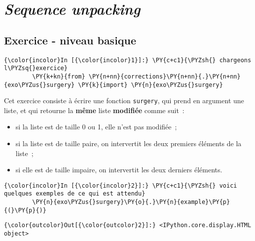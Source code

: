     
    
    
    

    

    \hypertarget{sequence-unpacking}{%
\section{\texorpdfstring{\emph{Sequence
unpacking}}{Sequence unpacking}}\label{sequence-unpacking}}

    \hypertarget{exercice---niveau-basique}{%
\subsection{Exercice - niveau basique}\label{exercice---niveau-basique}}

    \begin{Verbatim}[commandchars=\\\{\},frame=single,framerule=0.3mm,rulecolor=\color{cellframecolor}]
{\color{incolor}In [{\color{incolor}1}]:} \PY{c+c1}{\PYZsh{} chargeons l\PYZsq{}exercice}
        \PY{k+kn}{from} \PY{n+nn}{corrections}\PY{n+nn}{.}\PY{n+nn}{exo\PYZus{}surgery} \PY{k}{import} \PY{n}{exo\PYZus{}surgery}
\end{Verbatim}


    Cet exercice consiste à écrire une fonction \texttt{surgery}, qui prend
en argument une liste, et qui retourne la \textbf{même} liste
\textbf{modifiée} comme suit~:

\begin{itemize}
\tightlist
\item
  si la liste est de taille 0 ou 1, elle n'est pas modifiée~;
\item
  si la liste est de taille paire, on intervertit les deux premiers
  éléments de la liste~;
\item
  si elle est de taille impaire, on intervertit les deux derniers
  éléments.
\end{itemize}

    \begin{Verbatim}[commandchars=\\\{\},frame=single,framerule=0.3mm,rulecolor=\color{cellframecolor}]
{\color{incolor}In [{\color{incolor}2}]:} \PY{c+c1}{\PYZsh{} voici quelques exemples de ce qui est attendu}
        \PY{n}{exo\PYZus{}surgery}\PY{o}{.}\PY{n}{example}\PY{p}{(}\PY{p}{)}
\end{Verbatim}


\begin{Verbatim}[commandchars=\\\{\},frame=single,framerule=0.3mm,rulecolor=\color{cellframecolor}]
{\color{outcolor}Out[{\color{outcolor}2}]:} <IPython.core.display.HTML object>
\end{Verbatim}
            
